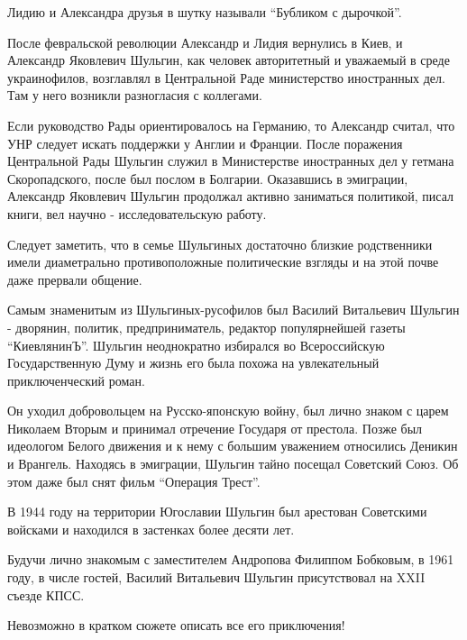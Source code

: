Лидию и Александра друзья в шутку называли \enquote{Бубликом с дырочкой}.


\vspace{1cm}

После февральской революции Александр и Лидия вернулись в Киев, и Александр
Яковлевич Шульгин, как человек авторитетный и уважаемый в среде украинофилов,
возглавлял в Центральной Раде министерство иностранных дел. Там у него возникли
разногласия с коллегами. 

Если руководство Рады ориентировалось на Германию, то Александр считал, что УНР
следует искать поддержки у Англии и Франции. После поражения Центральной Рады
Шульгин служил в Министерстве иностранных дел у гетмана Скоропадского, после
был послом в Болгарии. Оказавшись в эмиграции, Александр Яковлевич Шульгин
продолжал активно заниматься политикой, писал книги, вел научно -
исследовательскую работу.


Следует заметить, что в семье Шульгиных достаточно близкие родственники имели
диаметрально противоположные политические взгляды и на этой почве даже прервали
общение.

Самым знаменитым из Шульгиных-русофилов был Василий Витальевич Шульгин -
дворянин, политик, предприниматель, редактор популярнейшей газеты \enquote{КиевлянинЪ}.
Шульгин неоднократно избирался во Всероссийскую Государственную Думу и жизнь
его была похожа на увлекательный приключенческий роман. 

Он уходил добровольцем на Русско-японскую войну,  был лично знаком с царем
Николаем Вторым и принимал отречение Государя от престола. Позже был идеологом
Белого движения и к нему с большим уважением относились Деникин и Врангель.
Находясь в эмиграции, Шульгин тайно посещал Советский Союз. Об этом даже был
снят фильм \enquote{Операция Трест}.

В 1944 году на территории Югославии Шульгин был арестован Советскими войсками и
находился в застенках более десяти лет.

Будучи лично знакомым с заместителем Андропова Филиппом Бобковым, в 1961 году,
в числе гостей, Василий Витальевич Шульгин присутствовал на XXII съезде КПСС. 

Невозможно в кратком сюжете описать все его приключения! 


